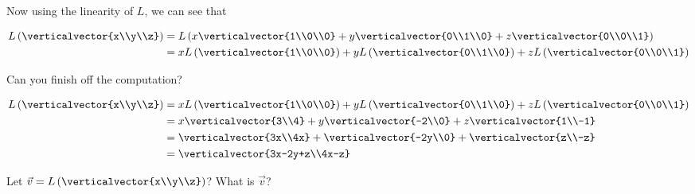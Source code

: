 \documentclass{ximera}
\begin{document}
\begin{question}
\begin{solution}
\begin{hint}
  		Now using the linearity of $L$, we can see that 
  		
  		\begin{align*}
  			L\left(\verticalvector{x\\y\\z}\right) &= L\left( x\verticalvector{1\\0\\0}+y\verticalvector{0\\1\\0}+z\verticalvector{0\\0\\1} \right)\\
  			&= xL\left(\verticalvector{1\\0\\0}\right)+yL\left(\verticalvector{0\\1\\0}\right)+zL\left(\verticalvector{0\\0\\1}\right)
  		\end{align*}
  		
  		Can you finish off the computation?
  	\end{hint}
  	\begin{hint}
  		\begin{align*}
  			L\left(\verticalvector{x\\y\\z}\right) &= xL\left(\verticalvector{1\\0\\0}\right)+yL\left(\verticalvector{0\\1\\0}\right)+zL\left(\verticalvector{0\\0\\1}\right)\\
  			&= x\verticalvector{3\\4}+y\verticalvector{-2\\0}+z\verticalvector{1\\-1}\\
  			&= \verticalvector{3x\\4x}+\verticalvector{-2y\\0}+\verticalvector{z\\-z}\\
  			&= \verticalvector{3x-2y+z\\4x-z}
  		\end{align*}
  	\end{hint}
    Let $\vec{v} = L\left(\verticalvector{x\\y\\z}\right)$?  What is $\vec{v}$?


\end{solution}
\end{question}
\end{document}
